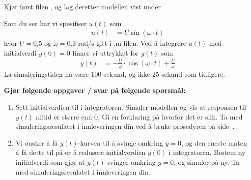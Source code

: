 


\item[o)]
   Kjør først filen , og lag deretter
   modellen vist under
  \begin{figure}[H]
    \centering
    \hspace*{0mm}
  \end{figure}
  Som du ser har vi spesifiser $u(t)$ som
  \begin{align}
    \label{eq:1ew}
    u(t) & = U \sin(\omega {\cdot}  t)
  \end{align}
  hvor $U{=}0.5$ og $\omega {=} 0.3$ rad/s gitt i .m-filen.
  Ved å integrere $u(t)$ med initialverdi $y(0){=}0$ finner vi uttrykket
  for $y(t)$ som
  \begin{align}
    y(t)  & = -\frac{U}{\omega}{\cdot}\cos(\omega{\cdot}t) +  \frac{U}{\omega}\label{eq:7aaa}
  \end{align}
  {\color{red}La simuleringstiden nå være 100 sekund, og ikke 25
    sekund som tidligere.  }

  {\bf Gjør følgende oppgaver / svar på følgende spørsmål:    }
  
\begin{enumerate}[label=o\arabic*)]
  \item Sett initialverdien til {} i integratoren.
 Simuler modellen og 
    vis at responsen til $y(t)$ alltid er større enn 0. Gi en
    forklaring på hvorfor det er slik.    
    Ta med simuleringsresulatet
    i innleveringen din ved å bruke prosedyren på
     side~\pageref{page:prosedyre}.

  \item   Vi ønsker å få $y(t)$-kurven til å 
  svinge omkring $y{=}0$, og den eneste måten å få dette til på er å
  redusere initialverdien $y(0)$ i integratoren. Bestem ny
  initialverdi som gjør at $y(t)$ svinger omkring $y{=}0$, og simuler på ny.
    Ta med simuleringsresulatet
    i innleveringen din.
  
 

  \end{enumerate}
